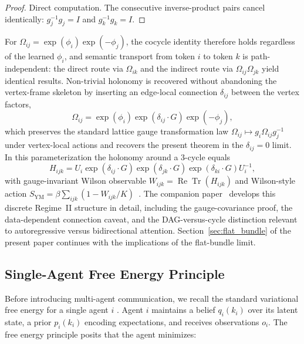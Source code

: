 \documentclass[twoside,11pt]{article}
\begin{document}
\begin{proof}
Direct computation. The consecutive inverse-product pairs cancel identically: $g_j^{-1} g_j = I$ and $g_k^{-1} g_k = I$.
\end{proof}

For $\Omega_{ij} = \exp(\phi_i)\exp(-\phi_j)$, the cocycle identity therefore holds regardless of the learned $\phi_i$, and semantic transport from token $i$ to token $k$ is path-independent: the direct route via $\Omega_{ik}$ and the indirect route via $\Omega_{ij} \Omega_{jk}$ yield identical results. Non-trivial holonomy is recovered without abandoning the vertex-frame skeleton by inserting an edge-local connection $\delta_{ij}$ between the vertex factors,
\begin{equation}
\Omega_{ij} = \exp(\phi_i) \exp(\delta_{ij}\cdot G) \exp(-\phi_j),
\label{eq:edge_relaxed_omega_glk}
\end{equation}
which preserves the standard lattice gauge transformation law $\Omega_{ij} \mapsto g_i \Omega_{ij} g_j^{-1}$ under vertex-local actions and recovers the present theorem in the $\delta_{ij}=0$ limit. In this parameterization the holonomy around a 3-cycle equals
\begin{equation}
H_{ijk} = U_i \exp(\delta_{ij}\cdot G) \exp(\delta_{jk}\cdot G) \exp(\delta_{ki}\cdot G) U_i^{-1},
\end{equation}
with gauge-invariant Wilson observable $W_{ijk} = \operatorname{Re}\operatorname{Tr}(H_{ijk})$ and Wilson-style action $S_{\mathrm{YM}} = \beta\sum_{ijk}(1 - W_{ijk}/K)$~\citep{WilsonConfinement1974,KogutSusskind1975,Creutz1983}. The companion paper~\cite{Dennis2025it} develops this discrete Regime~II structure in detail, including the gauge-covariance proof, the data-dependent connection caveat, and the DAG-versus-cycle distinction relevant to autoregressive versus bidirectional attention. Section~\ref{sec:flat_bundle} of the present paper continues with the implications of the flat-bundle limit.


\subsection{Single-Agent Free Energy Principle}

Before introducing multi-agent communication, we recall the standard variational free energy for a single agent $i$ \citep{friston2010free,parr2022active}. Agent $i$ maintains a belief $q_i(k_i)$ over its latent state, a prior $p_i(k_i)$ encoding expectations, and receives observations $o_i$. The free energy principle posits that the agent minimizes:
\end{document}
